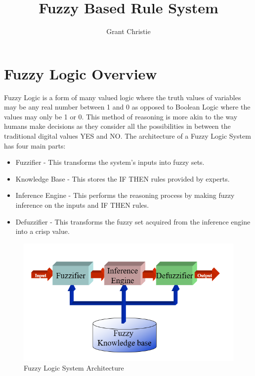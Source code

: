\documentclass{article}
\title{Fuzzy Based Rule System}
\author{Grant Christie}
\date{}
\begin{document}
\maketitle

\section{Fuzzy Logic Overview}
Fuzzy Logic is a form of many valued logic where the truth values of variables may be any real number between 1 and 0 as opposed to Boolean Logic where the values may only be 1 or 0. This method of reasoning is more akin to the way humans make decisions as they consider all the possibilities in between the traditional digital values YES and NO. The architecture of a Fuzzy Logic System has four main parts:

\begin{itemize}
  \item Fuzzifier - This transforms the system’s inputs into fuzzy sets.
  \item Knowledge Base - This stores the IF THEN rules provided by experts.
  \item Inference Engine - This performs the reasoning process by making fuzzy inference on the inputs and IF THEN rules.
  \item Defuzzifier - This transforms the fuzzy set acquired from the inference engine into a crisp value.
\end{itemize}

\begin{figure}[H]
\includegraphics[width=12cm]{architecture}
\caption{Fuzzy Logic System Architecture}
\end{figure}
\end{document}
